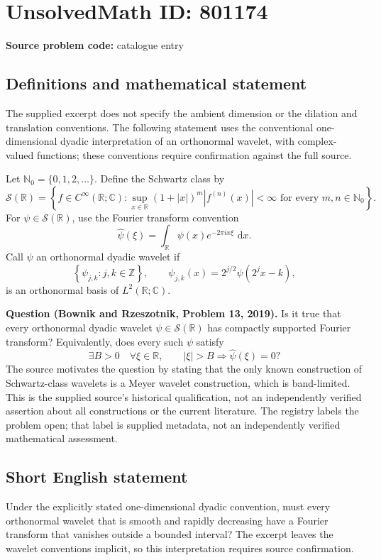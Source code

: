 \documentclass[11pt]{article}
\newcommand{\N}{\mathbb{N}}
\newcommand{\Z}{\mathbb{Z}}
\newcommand{\R}{\mathbb{R}}
\newcommand{\C}{\mathbb{C}}
\newcommand{\dd}{\,\mathrm{d}}
\begin{document}
\section*{UnsolvedMath ID: 801174}
\textbf{Source problem code:} catalogue entry
\subsection{Definitions and mathematical statement}
The supplied excerpt does not specify the ambient dimension or the dilation and translation conventions. The following statement uses the conventional one-dimensional dyadic interpretation of an orthonormal wavelet, with complex-valued functions; these conventions require confirmation against the full source.

Let \(\N_0=\{0,1,2,\ldots\}\). Define the Schwartz class by
\[
\mathcal S(\R)=\left\{f\in C^\infty(\R;\C):\sup_{x\in\R}(1+|x|)^m|f^{(n)}(x)|<\infty\text{ for every }m,n\in\N_0\right\}.
\]
For \(\psi\in\mathcal S(\R)\), use the Fourier transform convention
\[
\widehat\psi(\xi)=\int_{\R}\psi(x)e^{-2\pi i x\xi}\,\dd x.
\]
Call \(\psi\) an orthonormal dyadic wavelet if
\[
\left\{\psi_{j,k}:j,k\in\Z\right\},\qquad
\psi_{j,k}(x)=2^{j/2}\psi(2^j x-k),
\]
is an orthonormal basis of \(L^2(\R;\C)\).

\textbf{Question (Bownik and Rzeszotnik, Problem 13, 2019).} Is it true that every orthonormal dyadic wavelet \(\psi\in\mathcal S(\R)\) has compactly supported Fourier transform? Equivalently, does every such \(\psi\) satisfy
\[
\exists B>0\quad\forall\xi\in\R,\qquad |\xi|>B\Longrightarrow\widehat\psi(\xi)=0?
\]
The source motivates the question by stating that the only known construction of Schwartz-class wavelets is a Meyer wavelet construction, which is band-limited. This is the supplied source's historical qualification, not an independently verified assertion about all constructions or the current literature. The registry labels the problem open; that label is supplied metadata, not an independently verified mathematical assessment.
\subsection{Short English statement}
Under the explicitly stated one-dimensional dyadic convention, must every orthonormal wavelet that is smooth and rapidly decreasing have a Fourier transform that vanishes outside a bounded interval? The excerpt leaves the wavelet conventions implicit, so this interpretation requires source confirmation.
\end{document}
